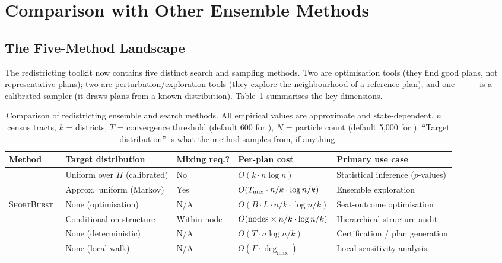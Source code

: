 \section{Comparison with Other Ensemble Methods}
\label{sec:comparison}

\subsection{The Five-Method Landscape}

The redistricting toolkit now contains five distinct search and sampling
methods.
Two are optimisation tools (they find good plans, not representative plans);
two are perturbation/exploration tools (they explore the neighbourhood of a
reference plan); and one --- \smc{} --- is a calibrated sampler (it draws
plans from a known distribution).
Table~\ref{tab:comparison} summarises the key dimensions.

\begin{table}[ht]
\centering
\caption{Comparison of redistricting ensemble and search methods.
  All empirical values are approximate and state-dependent.
  $n$ = census tracts, $k$ = districts, $T$ = convergence threshold
  (default 600 for \cs{}), $N$ = particle count (default 5{,}000 for \smc{}).
  ``Target distribution'' is what the method samples from, if anything.}
\label{tab:comparison}
\renewcommand{\arraystretch}{1.35}
\begin{tabular}{@{}p{2.5cm}p{2.8cm}p{1.6cm}p{2.4cm}p{3.5cm}@{}}
\toprule
Method & Target distribution & Mixing req.? & Per-plan cost & Primary use case \\
\midrule
\smc{}
  & Uniform over $\Pi$ (calibrated)
  & No
  & $O(k \cdot n \log n)$
  & Statistical inference ($p$-values) \\
\recom{}
  & Approx.\ uniform (Markov)
  & Yes
  & $O(T_{\rm mix} \cdot n/k \cdot \log n/k)$
  & Ensemble exploration \\
\textsc{ShortBurst}~\citep{cannon2022,g6paper}
  & None (optimisation)
  & N/A
  & $O(B \cdot L \cdot n/k \cdot \log n/k)$
  & Seat-outcome optimisation \\
\be{}~\citep{h1paper}
  & Conditional on structure
  & Within-node
  & $O({\rm nodes} \times n/k \cdot \log n/k)$
  & Hierarchical structure audit \\
\cs{}~\citep{b11paper}
  & None (deterministic)
  & N/A
  & $O(T \cdot n \log n / k)$
  & Certification / plan generation \\
\flip{}~\citep{g8paper}
  & None (local walk)
  & N/A
  & $O(F \cdot \deg_{\max})$
  & Local sensitivity analysis \\
\bottomrule
\end{tabular}
\end{table}

